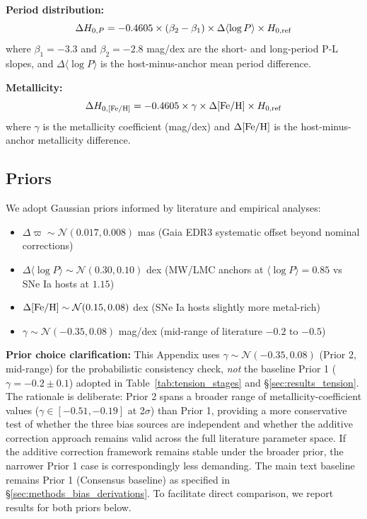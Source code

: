 \documentclass[preprint, linenumbers]{aastex701}
\begin{document}
\textbf{Period distribution:}
\begin{equation}
\Delta H_{0,P} = -0.4605 \times (\beta_2 - \beta_1) \times \Delta\langle \log P \rangle \times H_{0,\rm ref}
\end{equation}
where $\beta_1 = -3.3$ and $\beta_2 = -2.8$ mag/dex are the short- and long-period P-L slopes, and $\Delta\langle \log P \rangle$ is the host-minus-anchor mean period difference.

\textbf{Metallicity:}
\begin{equation}
\Delta H_{0,{\rm [Fe/H]}} = -0.4605 \times \gamma \times \Delta{\rm [Fe/H]} \times H_{0,\rm ref}
\end{equation}
where $\gamma$ is the metallicity coefficient (mag/dex) and $\Delta{\rm [Fe/H]}$ is the host-minus-anchor metallicity difference.

\subsection{Priors}

We adopt Gaussian priors informed by literature and empirical analyses:

\begin{itemize}
\item $\Delta\varpi \sim \mathcal{N}(0.017, 0.008)$ mas (Gaia EDR3 systematic offset beyond nominal corrections)
\item $\Delta\langle \log P \rangle \sim \mathcal{N}(0.30, 0.10)$ dex (MW/LMC anchors at $\langle \log P \rangle = 0.85$ vs SNe Ia hosts at $1.15$)
\item $\Delta{\rm [Fe/H]} \sim \mathcal{N}(0.15, 0.08)$ dex (SNe Ia hosts slightly more metal-rich)
\item $\gamma \sim \mathcal{N}(-0.35, 0.08)$ mag/dex (mid-range of literature $-0.2$ to $-0.5$)
\end{itemize}

\textbf{Prior choice clarification:} This Appendix uses $\gamma \sim \mathcal{N}(-0.35, 0.08)$ (Prior 2, mid-range) for the probabilistic consistency check, \textit{not} the baseline Prior 1 ($\gamma = -0.2 \pm 0.1$) adopted in Table~\ref{tab:tension_stages} and \S\ref{sec:results_tension}. The rationale is deliberate: Prior 2 spans a broader range of metallicity-coefficient values ($\gamma \in [-0.51, -0.19]$ at 2$\sigma$) than Prior 1, providing a more conservative test of whether the three bias sources are independent and whether the additive correction approach remains valid across the full literature parameter space. If the additive correction framework remains stable under the broader prior, the narrower Prior 1 case is correspondingly less demanding. The main text baseline remains Prior 1 (Consensus baseline) as specified in \S\ref{sec:methods_bias_derivations}. To facilitate direct comparison, we report results for both priors below.
\end{document}
